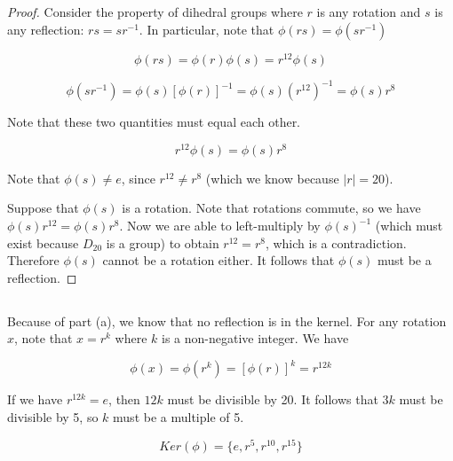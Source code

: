 \documentclass[a4paper,12pt]{article}
\numberwithin{equation}{section}
\begin{document}
\begin{proof}

Consider the property of dihedral groups where $r$ is any rotation and $s$ is any reflection: $rs = sr^{-1}$. In particular, note that $\phi(rs) = \phi(sr^{-1})$

\begin{equation}
\phi(rs) = \phi(r)\phi(s) = r^{12}\phi(s)
\end{equation}

\begin{equation}
\phi(sr^{-1}) = \phi(s)[\phi(r)]^{-1} = \phi(s)(r^{12})^{-1} = \phi(s)r^8
\end{equation}

Note that these two quantities must equal each other.

\begin{equation}
r^{12}\phi(s) = \phi(s)r^{8}
\end{equation}

Note that $\phi(s) \neq e$, since $r^{12} \neq r^8$ (which we know because $|r| = 20$). 

Suppose that $\phi(s)$ is a rotation. Note that rotations commute, so we have $\phi(s)r^{12} = \phi(s)r^{8}$. Now we are able to left-multiply by $\phi(s)^{-1}$ (which must exist because $D_{20}$ is a group) to obtain $r^{12} = r^8$, which is a contradiction. Therefore $\phi(s)$ cannot be a rotation either. It follows that $\phi(s)$ must be a reflection.

\end{proof}

\subsection{}

Because of part (a), we know that no reflection is in the kernel. For any rotation $x$, note that $x = r^k$ where $k$ is a non-negative integer. We have 

\begin{equation}
\phi(x) = \phi(r^k) = [\phi(r)]^k = r^{12k}
\end{equation}

If we have $r^{12k} = e$, then $12k$ must be divisible by 20. It follows that $3k$ must be divisible by 5, so $k$ must be a multiple of 5.

\begin{equation}
Ker(\phi) = \{e, r^5, r^{10}, r^{15} \}
\end{equation}
\end{document}
